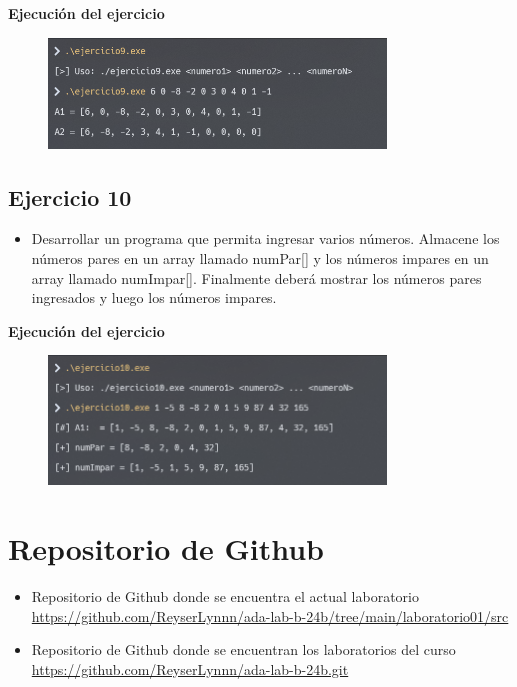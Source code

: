 \documentclass{article}
\begin{document}
        
        
        \textbf{Ejecución del ejercicio}
        \begin{figure}[H]
        	\centering
         	\includegraphics[width=0.8\textwidth,keepaspectratio]{img/ejercicio9.png}
        \end{figure}
        
    
    \subsection{Ejercicio 10}
        \begin{itemize}
            \item Desarrollar un programa que permita ingresar varios números. Almacene los números pares en
            un array llamado numPar[] y los números impares en un array llamado numImpar[]. Finalmente
            deberá mostrar los números pares ingresados y luego los números impares.
        \end{itemize}
        
        

        \textbf{Ejecución del ejercicio}
        \begin{figure}[H]
        	\centering
         	\includegraphics[width=0.8\textwidth,keepaspectratio]{img/ejercicio10.png}
        \end{figure}


\section{Repositorio de Github}
	\begin{itemize}
		\item Repositorio de Github donde se encuentra el actual laboratorio \\
		\url{https://github.com/ReyserLynnn/ada-lab-b-24b/tree/main/laboratorio01/src}

        \item Repositorio de Github donde se encuentran los laboratorios del curso\\
		\url{https://github.com/ReyserLynnn/ada-lab-b-24b.git}
	\end{itemize}
\end{document}
